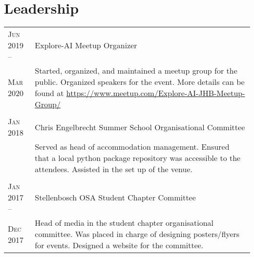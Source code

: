 \section{Leadership}

\begin{supertabular}{p{1.8cm}|p{12cm}}
	\textsc{Jun 2019 --} & Explore-AI Meetup Organizer\\
	\textsc{Mar 2020}& \small{Started, organized, and maintained a meetup group for the public. Organized speakers for the event. More details can be found at \href{https://www.meetup.com/Explore-AI-JHB-Meetup-Group/}{https://www.meetup.com/Explore-AI-JHB-Meetup-Group/}} \\
	 \\
	\textsc{Jan 2018} & Chris Engelbrecht Summer School Organisational Committee \\
	& \small{Served as head of accommodation management. Ensured that a local python package repository was accessible to the attendees. Assisted in the set up of the venue.} \\
	 \\
	\textsc{Jan 2017 --} & Stellenbosch OSA Student Chapter Committee \\
	\textsc{Dec 2017} & \small{Head of media in the student chapter organisational committee. Was placed in charge of designing posters/flyers for events. Designed a website for the committee.} \\
\end{supertabular}